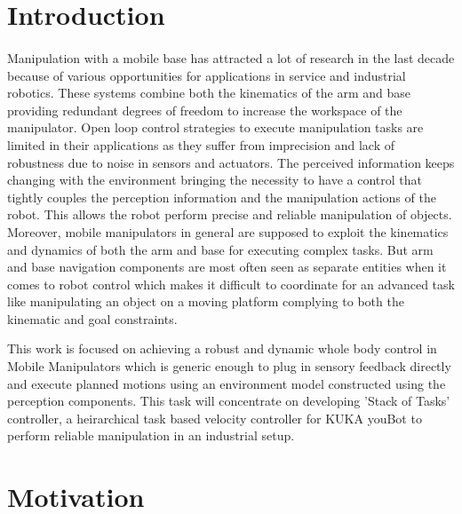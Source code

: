 
\section{Introduction}
 \paragraph{}
 Manipulation with a mobile base has attracted a lot of research in the last decade because of various opportunities for applications in service and industrial robotics. These 
 systems combine both the kinematics of the arm and base providing redundant degrees of freedom to increase the workspace of the manipulator. Open loop control strategies to execute manipulation tasks are limited in their applications as they suffer from imprecision and lack of robustness due to noise in sensors and actuators. The perceived information keeps changing with the environment bringing the necessity to have a control that tightly couples the perception information and the manipulation actions of the robot. This allows the robot perform precise and reliable manipulation of objects. Moreover, mobile manipulators in general are supposed to exploit the kinematics and dynamics of both the arm and base for executing complex tasks. But arm and base navigation components are most often seen as separate entities when it comes to robot control which makes it difficult to coordinate for an advanced task like manipulating an object on a moving platform complying to both the kinematic and goal constraints. 
 
 This work is focused on achieving a robust and dynamic whole body control in Mobile Manipulators which is generic enough to plug in sensory feedback directly and execute planned motions using an environment model constructed using the perception components. This task will concentrate on developing 'Stack of Tasks' controller, a heirarchical task
 based velocity controller for KUKA youBot to perform reliable manipulation in an industrial setup.
 \section{Motivation}
